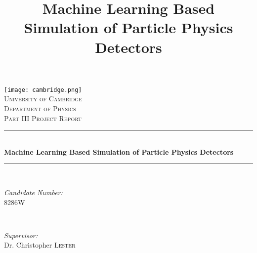 \documentclass[twocolumn]{article}
\title{Machine Learning Based Simulation of Particle Physics Detectors}
\date{\printdate{2017-05-15}}
\begin{document}
\begin{titlepage}
	
	\newcommand{\HRule}{\rule{\linewidth}{0.5mm}} %
	
	\center %
	
	\texttt{[image: cambridge.png]}\\[1cm] %
	\textsc{\LARGE University of Cambridge}\\[1.5cm]
	\textsc{\Large Department of Physics}\\[0.5cm]
	\textsc{\large Part III Project Report}\\[0.5cm]
	
	
	\HRule \\[0.4cm]
	{ \huge \bfseries Machine Learning Based Simulation of Particle Physics Detectors}\\[0.4cm] %
	\HRule \\[1.5cm]
	
	
	\begin{minipage}{0.4\textwidth}
		\begin{flushleft} \large
			\emph{Candidate Number:}\\
			8286W
		\end{flushleft}
	\end{minipage}
	~
	\begin{minipage}{0.4\textwidth}
		\begin{flushright} \large
			\emph{Supervisor:} \\
			Dr. Christopher \textsc{Lester} %
		\end{flushright}
	\end{minipage}\\[2in]
	
	

\end{titlepage}
\end{document}
